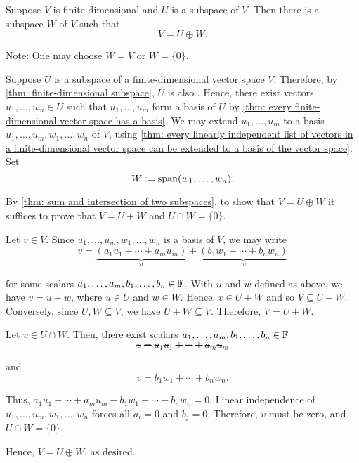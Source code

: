 \begin{thm} 
\label{thm:every-subspace-of-V-is-part-of-a-direct-sum-equal-to-V}
  Suppose $V$ is finite-dimensional and $U$ is a subspace of $V$. Then there is a subspace $W$ of $V$ such that
  \begin{equation}
    V = U \oplus W.
  \end{equation}

  Note: One may choose \(W=V\) or \(W=\{0\}\).
\end{thm}
\begin{prf}
  Suppose $U$ is a subspace of a finite-dimensional vector space $V$.
  Therefore, by \ref{thm: finite-dimensional subspace}, $U$ is also \fd .
  Hence, there exist vectors $u_1, \ldots, u_m \in U $ such that $u_1, \ldots, u_m $ form a basis of $U$ by \ref{thm: every finite-dimensional vector space has a basis}.
  We may extend $u_1, \ldots, u_m$ to a basis $u_1, \ldots, u_m, w_1, \ldots, w_n$ of $V$, using \ref{thm: every linearly independent list of vectors in a finite-dimensional vector space can be extended to a basis of the vector space}. Set
  \begin{equation}
    W :=\operatorname{span} (w_1, \ldots, w_n).
  \end{equation}

  By \ref{thm: sum and intersection of two subspaces}, to show that \(V = U \oplus W\) it suffices to prove that $V = U + W$ and $U \cap W = \{0\}$.
  \begin{description}
    \item{}
    Let $v \in V$. Since $u_1, \ldots, u_m, w_1, \ldots, w_n$ is a basis of $V$, we may write
    \begin{equation}
      v = \underbrace{(a_1 u_1 + \cdots + a_m u_m)}_{u} + \underbrace{(b_1 w_1 + \cdots + b_n w_n)}_{w}
    \end{equation}

    for some scalars $ a_1, \ldots, a_m, b_1, \ldots, b_n \in \mathbb{F}$. With $u$ and $w$ defined as above, we have $v=u+w$, where $u \in U$ and $w \in W$. Hence, $v \in U+W$ and so $V \subseteq U + W$. Conversely, since $U,W\subseteq V$, we have $U+W\subseteq V$.  Therefore, $V=U+W$.

    \item{}
    Let $v \in U \cap W$. Then, there exist scalars $a_1, \ldots, a_m, b_1, \ldots, b_n \in \mathbb{F}$ \st
    \begin{equation}
      v= a_1 u _1 + \cdots + a_m u_m
    \end{equation}

    and
    \begin{equation}
      v= b_1 w_1 + \cdots + b_n w_n.
    \end{equation}

    Thus, $a_1 u_1 + \cdots + a_m u_m - b_1 w_1 - \cdots - b_n w_n = 0$.
    Linear independence of \(u_1,\dots,u_m,w_1,\dots,w_n\) forces all \(a_i=0\) and \(b_j=0\). Therefore, $v$ must be zero, and $U \cap W = \{ 0\}$.
  \end{description}
  Hence, $V = U \oplus W$, as desired.
\end{prf}
